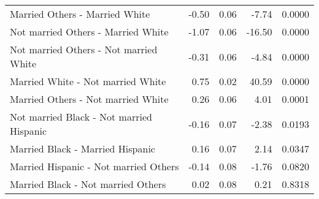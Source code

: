 \begin{table}[H]
\begin{tabular}{lrrrr}
    Married Others -  Married White & -0.50 & 0.06 & -7.74 & 0.0000 \\ 
    Not married Others -  Married White & -1.07 & 0.06 & -16.50 & 0.0000 \\ 
    Not married Others -  Not married White & -0.31 & 0.06 & -4.84 & 0.0000 \\ 
    Married White -  Not married White & 0.75 & 0.02 & 40.59 & 0.0000 \\ 
    Married Others -  Not married White & 0.26 & 0.06 & 4.01 & 0.0001 \\ 
    Not married Black -  Not married Hispanic & -0.16 & 0.07 & -2.38 & 0.0193 \\ 
    Married Black -  Married Hispanic & 0.16 & 0.07 & 2.14 & 0.0347 \\ 
    Married Hispanic -  Not married Others & -0.14 & 0.08 & -1.76 & 0.0820 \\ 
    Married Black -  Not married Others & 0.02 & 0.08 & 0.21 & 0.8318 \\ 
   \hline
\end{tabular}
\label{tab:ms_race_origin}
\end{table}

